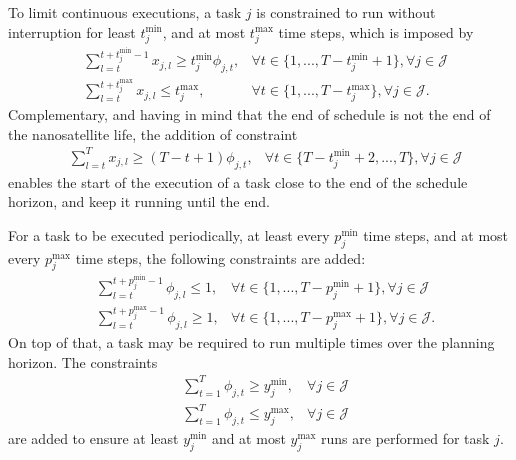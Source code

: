To limit continuous executions, a task $j$ is constrained to run without interruption for least $t_j^{\text{min}}$, and at most $t_j^{\text{max}}$ time steps, which is imposed by
\begin{equation}\label{eq:execution-gap-constraints}
    \begin{aligned}
        &\sum_{l=t}^{t+{t}^{\min}_{j}-1} x_{j,l} \geq {t}^{\min}_{j} \phi_{j,t},  &\forall t \in \{1,...,T-{t}^{\min}_{j} + 1\}, \forall j\in\mathcal{J} \\
        &\sum_{l=t}^{t+{t}^{\max}_{j}} x_{j,l} \leq {t}^{\max}_{j},  &\forall t \in \{1,...,T-{t}^{\max}_{j}\}, \forall j\in\mathcal{J}
    .\end{aligned}
\end{equation}
Complementary, and having in mind that the end of schedule is not the end of the nanosatellite life, the addition of constraint
\begin{equation}\label{eq:execution-end-constraints}
    \begin{aligned}
        &\sum_{l=t}^{T} x_{j,l} \geq (T - t + 1) \phi_{j,t},  & \forall t \in \{T-{t}^{\min}_{j} + 2,...,T\}, \forall j\in\mathcal{J}
    \end{aligned}
\end{equation}
enables the start of the execution of a task close to the end of the schedule horizon, and keep it running until the end.

For a task to be executed periodically, at least every $p_j^{\text{min}}$ time steps, and at most every $p_j^{\text{max}}$ time steps, the following constraints are added:
\begin{equation}\label{eq:prediodicity-constraints}
    \begin{aligned}
        &\sum_{l=t}^{t+{p}^{\min}_{j}-1} \phi_{j,l} \leq 1,   & \forall t \in \{1,...,T-{p}^{\min}_{j}+1\}, \forall j\in\mathcal{J}  \\
        & \sum_{l=t}^{t+{p}^{\max}_{j}-1} \phi_{j,l} \geq 1,  & \forall t \in \{1,...,T-{p}^{\max}_{j}+1\},  \forall j\in\mathcal{J} 
    .\end{aligned}
\end{equation}
On top of that, a task may be required to run multiple times over the planning horizon.
The constraints
\begin{equation}\label{eq:multiple-execs-constraints}
    \begin{aligned}
        &\sum_{t=1}^{T} \phi_{j,t} \geq {y}^{\min}_{j}, &\forall j\in\mathcal{J}   \\
        &\sum_{t=1}^{T} \phi_{j,t} \leq {y}^{\max}_{j}, &\forall j\in\mathcal{J}
    \end{aligned}
\end{equation}
are added to ensure at least $y_{j}^{\text{min}}$ and at most $y_j^{\text{max}}$ runs are performed for task $j$.

